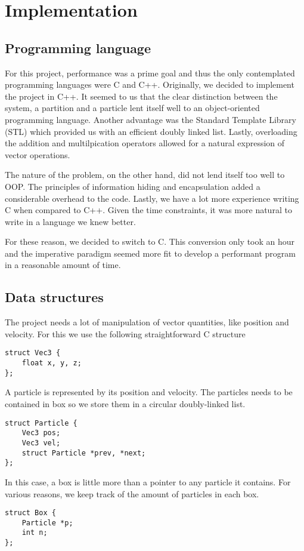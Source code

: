 \section{Implementation}

\subsection{Programming language}
For this project, performance was a prime goal and thus the only contemplated 
programming languages were C and C++.  Originally, we decided to implement the 
project in C++. It seemed to us that the clear distinction between the system, 
a partition and a particle lent itself well to an object-oriented programming 
language. Another advantage was the Standard Template Library (STL) which 
provided us with an efficient doubly linked list. Lastly, overloading the 
addition and multilpication operators allowed for a natural expression of 
vector operations.

The nature of the problem, on the other hand, did not lend itself too well 
to OOP. The principles of information hiding and encapsulation added a 
considerable overhead to the code. Lastly, we have a lot more experience 
writing C when compared to C++. Given the time constraints, it was more 
natural to write in a language we knew better.

For these reason, we decided to switch to C.  This conversion only took an 
hour and the imperative paradigm seemed more fit to develop a performant 
program in a reasonable amount of time.

\subsection{Data structures}

The project needs a lot of manipulation of vector quantities, like position 
and velocity. For this we use the following straightforward C structure

\begin{lstlisting}
struct Vec3 {
	float x, y, z;
};
\end{lstlisting}

A particle is represented by its position and velocity. The particles needs to 
be contained in box so we store them in a circular doubly-linked list.
\begin{lstlisting}
struct Particle {
	Vec3 pos;
	Vec3 vel;
	struct Particle *prev, *next;
};
\end{lstlisting}
In this case, a box is little more than a pointer to any particle it contains.  
For various reasons, we keep track of the amount of particles in each box.
\begin{lstlisting}
struct Box {
	Particle *p;
	int n;
};
\end{lstlisting}

